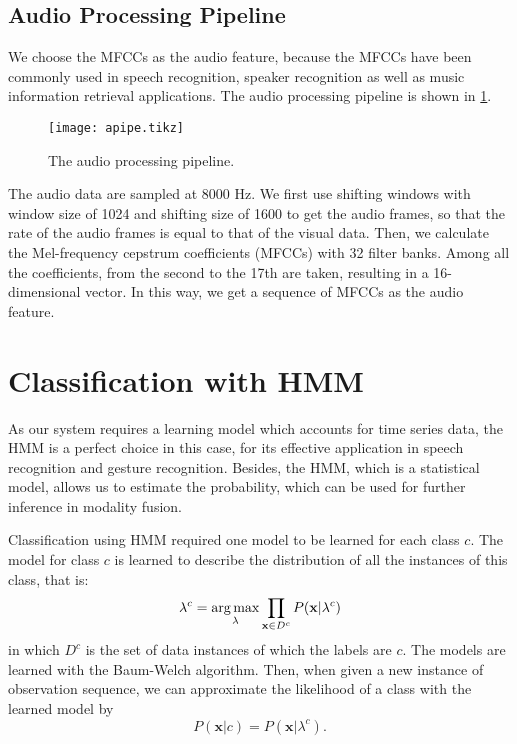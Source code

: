 \documentclass[12pt,final,twoside]{report}
\begin{document}
\subsection{Audio Processing Pipeline}
We choose the MFCCs as the audio feature, because the MFCCs have been commonly used in speech recognition, speaker recognition as well as music information retrieval applications. The audio processing pipeline is shown in \cref{fig:apipe}.

\begin{figure}[t]
  \centering
  \texttt{[image: apipe.tikz]}
  \caption{The audio processing pipeline.}
  \label{fig:apipe}
\end{figure}

The audio data are sampled at 8000 Hz. We first use shifting windows with window size of 1024 and shifting size of 1600 to get the audio frames, so that the rate of the audio frames is equal to that of the visual data. Then, we calculate the Mel-frequency cepstrum coefficients (MFCCs) with 32 filter banks. Among all the coefficients, from the second to the 17th are taken, resulting in a 16-dimensional vector. In this way, we get a sequence of MFCCs as the audio feature.

\section{Classification with HMM}
As our system requires a learning model which accounts for time series data, the HMM is a perfect choice in this case, for its effective application in speech recognition and gesture recognition. Besides, the HMM, which is a statistical model, allows us to estimate the probability, which can be used for further inference in modality fusion.

Classification using HMM required one model to be learned for each class $c$. The model for class $c$ is learned to describe the distribution of all the instances of this class, that is:
\begin{equation}
  \lambda^c = \operatorname*{arg\,max}_{\lambda} \prod_{\mathbf{x} \in D^c} P(\mathbf{x}|\lambda^c)
\end{equation}
in which $D^c$ is the set of data instances of which the labels are $c$. The models are learned with the Baum-Welch algorithm. Then, when given a new instance of observation sequence, we can approximate the likelihood of a class with the learned model by
\begin{equation}
  P(\mathbf{x}|c) = P(\mathbf{x}|\lambda^c) .
\end{equation}
\end{document}
